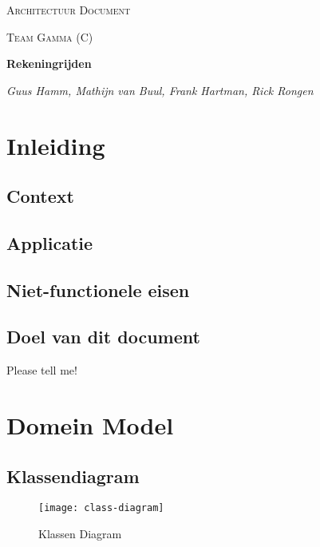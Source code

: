 \documentclass{scrreprt}
\begin{document}
	\begin{titlepage}
		\centering
		{\scshape\LARGE Architectuur Document \par}
		\vspace{1cm}
		{\scshape\Large Team Gamma (C)\par}
		\vspace{1.5cm}
		{\huge\bfseries Rekeningrijden\par}
		\vspace{2cm}
		{\large\itshape Guus Hamm, Mathijn van Buul, Frank Hartman, Rick Rongen\par}
		\vfill
		{\large \vhCurrentVersion\par}
		{\large \vhCurrentDate\par}
	\end{titlepage}
	\tableofcontents
	\newpage
	\begin{versionhistory}
	\end{versionhistory}

	\newpage
	\chapter{Inleiding}
	\section{Context}
	\section{Applicatie}
	\section{Niet-functionele eisen}
	\section{Doel van dit document}
	Please tell me!
	
	\newpage
	\chapter{Domein Model}
	\section{Klassendiagram}
	\begin{figure}[ht]
		\centering
		\texttt{[image: class-diagram]}
		\label{pic:class-diagram}
		\caption{Klassen Diagram}
	\end{figure}
\end{document}
